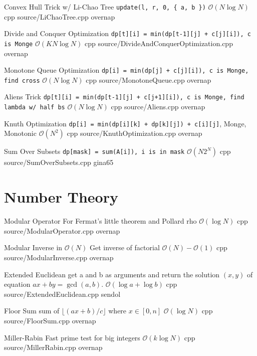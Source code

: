 \documentclass[landscape, 10pt, a4paper, oneside, twocolumn]{extarticle}
\begin{document}
\Algorithm
{Convex Hull Trick w/ Li-Chao Tree}
{\texttt{update(l, r, 0, \{ a, b \})}}
{$\mathcal{O}(N\log{N})$}
{cpp}
{source/LiChaoTree.cpp}
{overnap}

\Algorithm
{Divide and Conquer Optimization}
{\texttt{dp[t][i] = min(dp[t-1][j] + c[j][i]), c is Monge}}
{$\mathcal{O}(KN\log{N})$}
{cpp}
{source/DivideAndConquerOptimization.cpp}
{overnap}

\Algorithm
{Monotone Queue Optimization}
{\texttt{dp[i] = min(dp[j] + c[j][i]), c is Monge, find cross}}
{$\mathcal{O}(N\log{N})$}
{cpp}
{source/MonotoneQueue.cpp}
{overnap}

\Algorithm
{Aliens Trick}
{\texttt{dp[t][i] = min(dp[t-1][j] + c[j+1][i]), c is Monge, find lambda w/ half bs}}
{$\mathcal{O}(N\log{N})$}
{cpp}
{source/Aliens.cpp}
{overnap}

\Algorithm
{Knuth Optimization}
{\texttt{dp[i] = min(dp[i][k] + dp[k][j]) + c[i][j]}, Monge, Monotonic}
{$\mathcal{O}(N^2)$}
{cpp}
{source/KnuthOptimization.cpp}
{overnap}


\Algorithm
{Sum Over Subsets}
{\texttt{dp[mask] = sum(A[i]), i is in mask}}
{$\mathcal{O}(N2^N)$}
{cpp}
{source/SumOverSubsets.cpp}
{gina65}


\section{Number Theory}

\Algorithm
{Modular Operator}
{For Fermat's little theorem and Pollard rho}
{$\mathcal{O}(\log{N})$}
{cpp}
{source/ModularOperator.cpp}
{overnap}

\Algorithm
{Modular Inverse in $\mathcal{O}(N)$}
{Get inverse of factorial}
{$\mathcal{O}(N)-\mathcal{O}(1)$}
{cpp}
{source/ModularInverse.cpp}
{overnap}

\Algorithm
{Extended Euclidean}
{get a and b as arguments and return the solution $(x, y)$ of equation $ax + by = \gcd(a, b)$.}
{$\mathcal{O}(\log{a} + \log{b})$}
{cpp}
{source/ExtendedEuclidean.cpp}
{sendol}

\Algorithm
{Floor Sum}
{sum of $\lfloor(ax + b)/c\rfloor$ where $x \in [0, n]$}
{$\mathcal{O}(\log{N})$}
{cpp}
{source/FloorSum.cpp}
{overnap}

\Algorithm
{Miller-Rabin}
{Fast prime test for big integers}
{$\mathcal{O}(k\log{N})$}
{cpp}
{source/MillerRabin.cpp}
{overnap}
\end{document}

